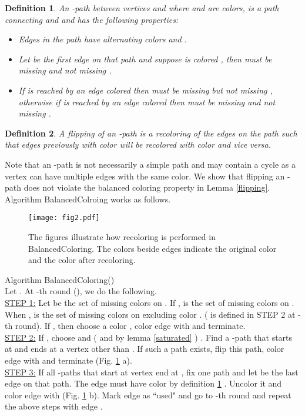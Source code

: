 \documentclass[titlepage, 11pt]{article}
\newtheorem{definition}{Definition}
\begin{document}
\begin{definition}\label{def:path}
An \emph{-path} between vertices  and  where  and  are colors, is a path connecting  and  and has the following properties:
\begin{itemize}
\item Edges in the path have alternating colors  and . 
\item Let  be the first edge on that path and suppose  is colored , then  must be missing  and not missing . 
\item If  is reached by an edge colored  then  must be missing  but not missing , otherwise if  is reached by an edge colored  then  must be missing  and not missing .
\end{itemize}  
\end{definition}
\begin{definition}
A flipping of an -path is a recoloring of the edges on the path such that edges previously with color  will be recolored with color  and vice versa. 
\end{definition}

Note that an -path is not necessarily a simple path and may contain a cycle as a vertex can have multiple edges with the same color.
We show that flipping an -path does not violate the balanced coloring property in Lemma \ref{flipping}.
Algorithm {\sc BalancedColroing} works as follows. \\


\begin{figure}[t]
\begin{center}
    \centerline{\texttt{[image: fig2.pdf]}}
    \caption{\small The figures illustrate how recoloring is performed in {\sc BalancedColoring}. The colors beside edges
indicate the original color and the color after recoloring. \vspace{-0.3in}}
 \label{fig:phaseone}
 \end{center}
\end{figure}

\noindent Algorithm {\sc BalancedColoring(}) \\
Let . At -th round (), we do the following. \\
\underline{STEP 1:} Let  be the set of missing colors on .
If ,  is the set of missing colors on . 
When ,  is  the set of missing colors on  excluding color .
( is defined in STEP 2 at -th round).
If , 
then choose a color , color edge  with  and terminate. \\
\underline{STEP 2:} If , choose  and  ( and   by lemma \ref{saturated} ) . Find a -path that starts at  and ends at a vertex other than . If such a path exists, flip this path, color edge  with  and terminate (Fig. \ref{fig:phaseone} a).\\
\underline{STEP 3:} If all -paths that start at vertex  end at , fix one path and let  be the last edge on that path. The edge  must have color  by definition \ref{def:path} . Uncolor it and color edge  with  (Fig. \ref{fig:phaseone} b). Mark edge  as ``used" and go to -th round and repeat the above steps with edge .
\end{document}
